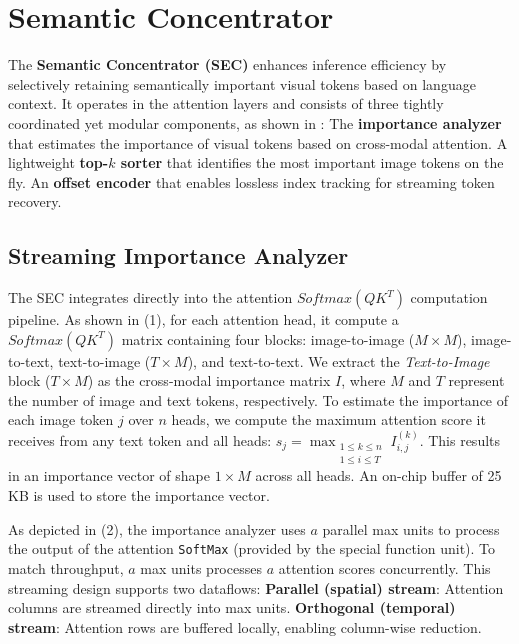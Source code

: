 \section{Semantic Concentrator}
\label{sec:sec}


The \textbf{Semantic Concentrator (SEC)} enhances inference efficiency by selectively retaining semantically important visual tokens based on language context. 
It operates in the attention layers and consists of three tightly coordinated yet modular components, as shown in :
The \textbf{importance analyzer} that estimates the importance of visual tokens based on cross-modal attention.
A lightweight \textbf{top-$k$ sorter} that identifies the most important image tokens on the fly.
An \textbf{offset encoder} that enables lossless index tracking for streaming token recovery.
 

\subsection{Streaming Importance Analyzer}

{The SEC integrates directly into the attention {$Softmax(QK^T)$} computation pipeline}. As shown in (1), for each attention head, it compute a {$Softmax(QK^T)$} matrix containing four blocks: image-to-image ($M \times M$), image-to-text, text-to-image ($T \times M$), and text-to-text. 
We extract the \textit{Text-to-Image} block ($T \times M$) as the cross-modal importance matrix $I$, where $M$ and $T$ represent the number of image and text tokens, respectively.
To estimate the importance of each image token $j$ over $n$ heads, we compute the maximum attention score it receives from any text token and all heads:
$
s_j = \max_{\substack{1 \leq k \leq n \\ 1 \leq i \leq T}} I^{(k)}_{i,j}
$.
This results in an importance vector of shape $1 \times M$ across all heads. {An on-chip buffer of 25 KB is used to store the importance vector.}

As depicted in (2), the importance analyzer uses {$a$ parallel max units to process the output of the attention \texttt{SoftMax} (provided by the special function unit).} To match throughput, {$a$ max units processes $a$ attention scores concurrently}. This streaming design supports two dataflows:
\textbf{Parallel (spatial) stream}: Attention columns are streamed directly into max units.
\textbf{Orthogonal (temporal) stream}: Attention rows are buffered locally, enabling column-wise reduction.

